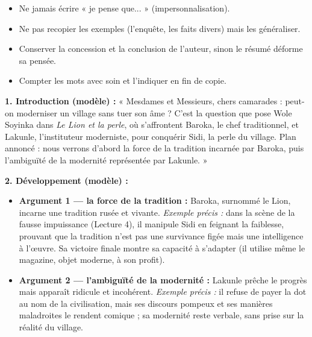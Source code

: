 \documentclass[11pt]{article}
\newcommand{\cle}[1]{{\popxbold\color{popdark}#1}}
\begin{document}
\begin{corrige}
\begin{attention}
\begin{itemize}
\item Ne jamais écrire « je pense que... » (\cle{impersonnalisation}).
\item Ne pas recopier les exemples (l'enquête, les faits divers) mais les \cle{généraliser}.
\item Conserver la \cle{concession} et la \cle{conclusion} de l'auteur, sinon le résumé déforme sa pensée.
\item Compter les mots avec soin et l'indiquer en fin de copie.
\end{itemize}
\end{attention}
\end{corrige}

\begin{corrige}
\textbf{1. \cle{Introduction} (modèle) :} « Mesdames et Messieurs, chers camarades : peut-on moderniser un village sans tuer son âme ? C'est la question que pose Wole Soyinka dans \emph{Le Lion et la perle}, où s'affrontent Baroka, le chef traditionnel, et Lakunle, l'instituteur moderniste, pour conquérir Sidi, la perle du village. \cle{Plan annoncé} : nous verrons d'abord la force de la tradition incarnée par Baroka, puis l'ambiguïté de la modernité représentée par Lakunle. »

\textbf{2. \cle{Développement} (modèle) :}
\begin{itemize}
\item \textbf{Argument 1 — la force de la tradition :} Baroka, surnommé le Lion, incarne une tradition \cle{rusée} et \cle{vivante}. \emph{Exemple précis :} dans la scène de la fausse impuissance (Lecture 4), il manipule Sidi en feignant la faiblesse, prouvant que la tradition n'est pas une survivance figée mais une \cle{intelligence à l'œuvre}. Sa victoire finale montre sa capacité à \cle{s'adapter} (il utilise même le magazine, objet moderne, à son profit).
\item \textbf{Argument 2 — l'ambiguïté de la modernité :} Lakunle prêche le progrès mais apparaît \cle{ridicule} et \cle{incohérent}. \emph{Exemple précis :} il refuse de payer la dot au nom de la civilisation, mais ses discours pompeux et ses manières maladroites le rendent comique ; sa modernité reste \cle{verbale}, sans prise sur la réalité du village.
\end{itemize}


\end{corrige}
\end{document}
